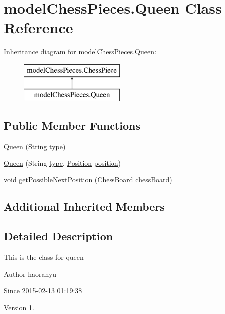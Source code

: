 \hypertarget{classmodel_chess_pieces_1_1_queen}{\section{model\+Chess\+Pieces.\+Queen Class Reference}
\label{classmodel_chess_pieces_1_1_queen}
}
Inheritance diagram for model\+Chess\+Pieces.\+Queen\+:\begin{figure}[H]
\begin{center}
\leavevmode
\includegraphics[height=2.000000cm]{classmodel_chess_pieces_1_1_queen}
\end{center}
\end{figure}
\subsection*{Public Member Functions}
\begin{DoxyCompactItemize}
\item 
\hyperlink{classmodel_chess_pieces_1_1_queen_a7b704ff103b506b01303c9acfc777240}{Queen} (String \hyperlink{classmodel_chess_pieces_1_1_chess_piece_a195487ca88c197af7c1604247be31db2}{type})
\item 
\hyperlink{classmodel_chess_pieces_1_1_queen_a020aae1c181f51bf9a587c35ff7388c4}{Queen} (String \hyperlink{classmodel_chess_pieces_1_1_chess_piece_a195487ca88c197af7c1604247be31db2}{type}, \hyperlink{classmodel_core_1_1_position}{Position} \hyperlink{classmodel_chess_pieces_1_1_chess_piece_a3d4362d5b28f6edb14161196d9c6807d}{position})
\item 
void \hyperlink{classmodel_chess_pieces_1_1_queen_af661882e66b15eb897cb437774f136ad}{get\+Possible\+Next\+Position} (\hyperlink{classmodel_core_1_1_chess_board}{Chess\+Board} chess\+Board)
\end{DoxyCompactItemize}
\subsection*{Additional Inherited Members}


\subsection{Detailed Description}
This is the class for queen \begin{DoxyAuthor}{Author}
haoranyu 
\end{DoxyAuthor}
\begin{DoxySince}{Since}
2015-\/02-\/13 01\+:19\+:38 
\end{DoxySince}
\begin{DoxyVersion}{Version}
1. 
\end{DoxyVersion}


